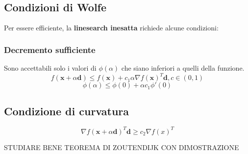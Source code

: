 \documentclass[\main/main.tex]{subfiles}
\begin{document}
\subsection{Condizioni di Wolfe}
Per essere efficiente, la \textbf{linesearch inesatta} richiede alcune condizioni:

\subsubsection{Decremento sufficiente}
Sono accettabili solo i valori di $\phi (\alpha)$ che siano inferiori a quelli della funzione.
\[
  f(\bm{x} + \alpha \bm{d}) \leq f(\bm{x}) + c_1\alpha \nabla f(\bm{x})^T \bm{d}, c \in (0,1)
\]
\[
  \phi(\alpha) \leq \phi(0) + \alpha c_1 \phi' (0)
\]

\subsection{Condizione di curvatura}

\[
  \nabla f(\bm{x} + \alpha \bm{d})^T \bm{d} \geq c_2 \nabla f(x)^T
\]


STUDIARE BENE TEOREMA DI ZOUTENDIJK CON DIMOSTRAZIONE

\begin{center}
\end{center}
\end{document}
